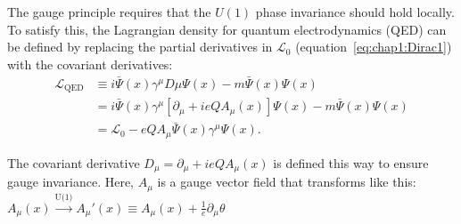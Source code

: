
The gauge principle requires that the $U(1)$ phase invariance should hold locally. To satisfy
this, the Lagrangian density for quantum electrodynamics (QED) can be defined by replacing the partial derivatives in $\mathcal{L}_{0}$ (equation~\ref{eq:chap1:Dirac1}) with the covariant derivatives: %
\begin{equation}\label{eq:chap1:Dirac2}
\begin{split}
	\mathcal{L}_{\text{QED}} &\equiv i \bar{\Psi}(x) \gamma^{\mu} D{\mu} \Psi(x) - m \bar{\Psi}(x) \Psi(x) \\
				&=  i \bar{\Psi}(x) \gamma^{\mu} [ \partial_{\mu} + ieQA_{\mu}(x)] \Psi(x) - m \bar{\Psi}(x) \Psi(x) \\
				&= \mathcal{L}_{0} - eQA_{\mu}\bar{\Psi}(x)\gamma^{\mu}\Psi(x).
\end{split}
\end{equation}

The covariant derivative $D_{\mu}= \partial_{\mu} + ieQA_{\mu}(x)$ is defined this way to ensure gauge invariance. 
Here, $A_{\mu}$ is a gauge vector field that transforms like this:
 $A_{\mu}(x) \xrightarrow{\text{U(1)}} A_{\mu}'(x) \equiv A_{\mu}(x)+\frac{1}{e}\partial_{\mu}\theta$ 

